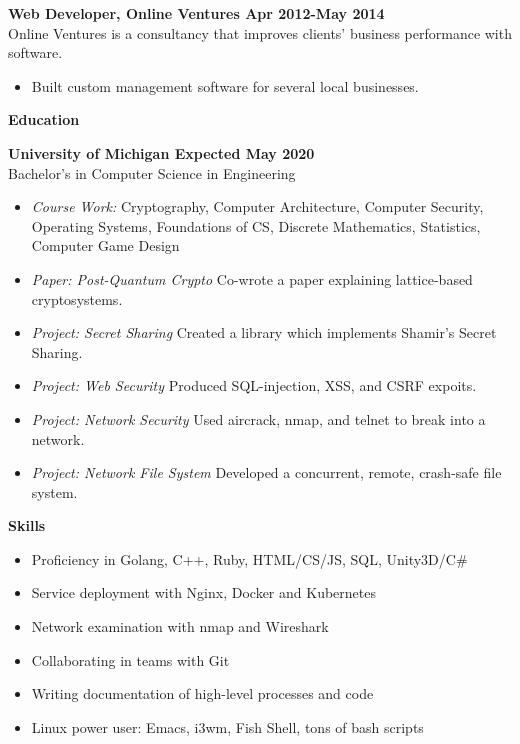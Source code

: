 \documentclass[10pt,letter]{article}
\begin{document}
\textbf{Web Developer, Online Ventures \hfill Apr 2012-May 2014}\\
Online Ventures is a consultancy that improves clients’ business performance with software.
\begin{itemize}[leftmargin=1em]
  \setlength\itemsep{-0.3em}
  \item Built custom management software for several local businesses.
\end{itemize}
\vspace{0.15in}

{\LARGE\textbf{Education}}
\vspace{0.15in}

\textbf{University of Michigan \hfill  Expected May 2020} \\
Bachelor's in Computer Science in Engineering
\begin{itemize}[leftmargin=1em]
  \setlength\itemsep{-0.3em}
  \item \textit{Course Work: } Cryptography, Computer Architecture, Computer Security, Operating Systems, Foundations of CS, Discrete Mathematics, Statistics, Computer Game Design
  \item \textit{Paper: Post-Quantum Crypto } Co-wrote a paper explaining lattice-based cryptosystems.
  \item \textit{Project: Secret Sharing } Created a library which implements Shamir's Secret Sharing.
  \item \textit{Project: Web Security } Produced SQL-injection, XSS, and CSRF expoits.
  \item \textit{Project: Network Security } Used aircrack, nmap, and telnet to break into a network.
  \item \textit{Project: Network File System } Developed a concurrent, remote, crash-safe file system.
\end{itemize}



\vspace{0.25in}

{\LARGE\textbf{Skills}}

\begin{itemize}[leftmargin=1em]
  \setlength\itemsep{-0.3em}
  \item{Proficiency in Golang, C++, Ruby, HTML/CS/JS, SQL, Unity3D/C\#}
  \item{Service deployment with Nginx, Docker and Kubernetes}
  \item{Network examination with nmap and Wireshark}
  \item{Collaborating in teams with Git}
  \item{Writing documentation of high-level processes and code}
  \item{Linux power user: Emacs, i3wm, Fish Shell, tons of bash scripts}
\end{itemize}
\end{document}
